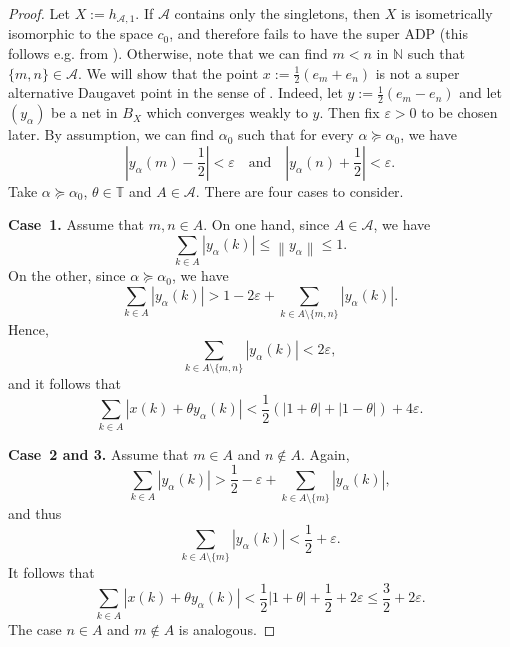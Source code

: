 \documentclass[11pt,a4paper,reqno]{amsart}
\numberwithin{equation}{section}
\newcommand{\abs}[1]{\left\lvert#1\right\rvert}
\newcommand{\norm}[1]{\left\lVert#1\right\rVert}
\newcommand{\N}{\mathbb{N}}
\newcommand{\A}{\mathcal{A}}
\newcommand{\eps}{\varepsilon}
\newcommand{\1}{\mathbbm{1}}
\newcommand{\T}{\mathbb{T}}
\renewcommand{\leq}{\leqslant}
\theoremstyle{plain}
\theoremstyle{definition}
\begin{document}
\begin{proof}
    Let $X:=h_{\A,1}$. If $\A$ contains only the singletons, then $X$ is isometrically isomorphic to the space $c_0$, and therefore fails to have the super ADP (this follows e.g. from \cite[Theorem~3.10]{LLMRZP25}). Otherwise, note that we can find $m<n$ in $\N$ such that $\{m,n\}\in\A$. We will show that the point $x:=\frac{1}{2}(e_m+e_n)$ is not a super alternative Daugavet point in the sense of \cite{LLMRZP25}. Indeed, let $y:=\frac{1}{2}(e_m-e_n)$ and let $(y_\alpha)$ be a net in $B_X$ which converges weakly to $y$. Then fix $\eps>0$ to be chosen later. By assumption, we can find $\alpha_0$ such that for every $\alpha\succeq\alpha_0$, we have \begin{equation*}
        \abs{y_\alpha(m)-\frac{1}{2}}<\eps\quad\text{and}\quad\abs{y_\alpha(n)+\frac{1}{2}}<\eps.
    \end{equation*} Take $\alpha\succeq \alpha_0$, $\theta\in\T$ and $A\in\A$. There are four cases to consider.

    \textbf{Case~1.} Assume that $m,n\in A$. On one hand, since $A\in\A$, we have \begin{equation*}
        \sum_{k\in A}\abs{y_\alpha(k)}\leq \norm{y_\alpha}\leq 1.
    \end{equation*} On the other, since $\alpha\succeq\alpha_0$, we have \begin{equation*}
        \sum_{k\in A}\abs{y_\alpha(k)}>1-2\eps+\sum_{k\in A\setminus\{m,n\}}\abs{y_\alpha(k)}.
    \end{equation*} Hence, \begin{equation*}
        \sum_{k\in A\setminus\{m,n\}}\abs{y_\alpha(k)}<2\eps,
    \end{equation*} and it follows that \begin{equation*}
        \sum_{k\in A}\abs{x(k)+\theta y_\alpha(k)}<\frac{1}{2}(\abs{1+\theta}+\abs{1-\theta})+4\eps. 
    \end{equation*}

    \textbf{Case~2 and 3.} Assume that $m\in A$ and $n\notin A$. Again, \begin{equation*}
        \sum_{k\in A}\abs{y_\alpha(k)}>\frac{1}{2}-\eps+\sum_{k\in A\setminus\{m\}}\abs{y_\alpha(k)},
    \end{equation*} and thus \begin{equation*}
        \sum_{k\in A\setminus\{m\}}\abs{y_\alpha(k)}<\frac{1}{2}+\eps.
    \end{equation*} It follows that \begin{equation*}
        \sum_{k\in A}\abs{x(k)+\theta y_\alpha(k)}<\frac{1}{2}\abs{1+\theta}+\frac{1}{2}+2\eps\leq \frac{3}{2}+2\eps. 
    \end{equation*} The case $n\in A$ and $m\notin A$ is analogous.


\end{proof}
\end{document}
